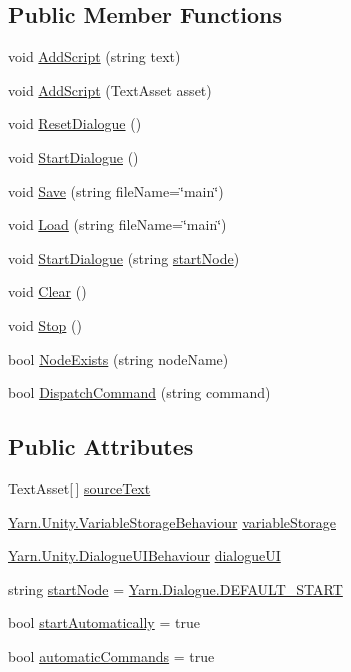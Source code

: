 \subsection*{Public Member Functions}
\begin{DoxyCompactItemize}
\item 
void \hyperlink{a00051_a88d161b1be7c99b1e202e6ae9e0d1e73}{Add\-Script} (string text)
\item 
void \hyperlink{a00051_a2fd7f165afff0b8bc2004f10ce4537dd}{Add\-Script} (Text\-Asset asset)
\item 
void \hyperlink{a00051_ac08900ac15b3ca90446b9454c7fd117e}{Reset\-Dialogue} ()
\item 
void \hyperlink{a00051_ab083d0ac60b41958b591c632e3c3a53e}{Start\-Dialogue} ()
\item 
void \hyperlink{a00051_a7d04224de4b27657edcfb3449dd182c1}{Save} (string file\-Name=\char`\"{}main\char`\"{})
\item 
void \hyperlink{a00051_a3ea5779e3b7b34853f640451616f7308}{Load} (string file\-Name=\char`\"{}main\char`\"{})
\item 
void \hyperlink{a00051_abda765c6804853e264282a0f45920cd3}{Start\-Dialogue} (string \hyperlink{a00051_a61c92b8d2228d01d8ac123b73bbb41a0}{start\-Node})
\item 
void \hyperlink{a00051_a09f5769c0c0921a21e659fed0af09c01}{Clear} ()
\item 
void \hyperlink{a00051_af94e66876098f8b187181014973645e6}{Stop} ()
\item 
bool \hyperlink{a00051_aadf7711b9ba101d6ce8ba491d9c5a4c3}{Node\-Exists} (string node\-Name)
\item 
bool \hyperlink{a00051_a7b200f8ddcf77f50906a6341aadeb671}{Dispatch\-Command} (string command)
\end{DoxyCompactItemize}
\subsection*{Public Attributes}
\begin{DoxyCompactItemize}
\item 
Text\-Asset\mbox{[}$\,$\mbox{]} \hyperlink{a00051_a71eae33d06990a3aec5d444fae017492}{source\-Text}
\item 
\hyperlink{a00103}{Yarn.\-Unity.\-Variable\-Storage\-Behaviour} \hyperlink{a00051_a6cca3d33f8b0ce3e750caed9fd8fc734}{variable\-Storage}
\item 
\hyperlink{a00052}{Yarn.\-Unity.\-Dialogue\-U\-I\-Behaviour} \hyperlink{a00051_ac87fdc65b0be57868f80c0fcd62ffd6d}{dialogue\-U\-I}
\item 
string \hyperlink{a00051_a61c92b8d2228d01d8ac123b73bbb41a0}{start\-Node} = \hyperlink{a00050_a1b643f15f734090e6a58cbf13dafd28f}{Yarn.\-Dialogue.\-D\-E\-F\-A\-U\-L\-T\-\_\-\-S\-T\-A\-R\-T}
\item 
bool \hyperlink{a00051_a6476a987f9788dba653976bcbe72980c}{start\-Automatically} = true
\item 
bool \hyperlink{a00051_a6aac5e877d5396a8141da5e85243f462}{automatic\-Commands} = true
\end{DoxyCompactItemize}
